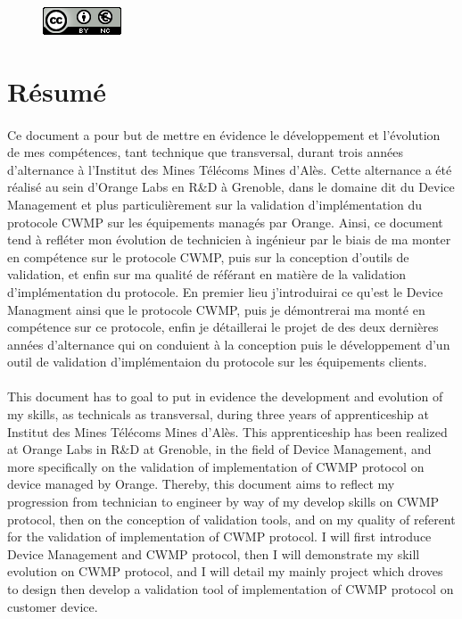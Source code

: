 \documentclass[12pt,a4paper]{report}
\begin{document}
\begin{figure}[!b]
	\center
    \includegraphics[scale=1]{./img/CC_BY-NC_2.png}
\end{figure}

\newpage
\section*{Résumé}
\paragraph*{}Ce document a pour but de mettre en évidence le développement et l'évolution de mes compétences, tant technique que transversal, durant trois années d'alternance à l'Institut des Mines Télécoms Mines d'Alès. Cette alternance a été réalisé au sein d'Orange Labs en R\&D à Grenoble, dans le domaine dit du Device Management et plus particulièrement sur la validation d'implémentation du protocole CWMP sur les équipements managés par Orange. Ainsi, ce document tend à refléter mon évolution de technicien à ingénieur par le biais de ma monter en compétence sur le protocole CWMP, puis sur la conception d'outils de validation, et enfin sur ma qualité de référant en matière de la validation d'implémentation du protocole. En premier lieu j'introduirai ce qu'est le Device Managment ainsi que le protocole CWMP, puis je démontrerai ma monté en compétence sur ce protocole, enfin je détaillerai le projet de des deux dernières années d'alternance qui on conduient à la conception puis le développement d'un outil de validation d'implémentaion du protocole sur les équipements clients.
\paragraph*{}This document has to goal to put in evidence the development and evolution of my skills, as technicals as transversal, during three years of apprenticeship at Institut des Mines Télécoms Mines d'Alès. This apprenticeship has been realized at Orange Labs in R\&D at Grenoble, in the field of Device Management, and more specifically on the validation of implementation of CWMP protocol on device managed by Orange. Thereby, this document aims to reflect my progression from technician to engineer by way of my develop skills on CWMP protocol, then on the conception of validation tools, and on my quality of referent for the validation of implementation of CWMP protocol. I will first introduce Device Management and CWMP protocol, then I will demonstrate my skill evolution on CWMP protocol, and I will detail my mainly project which droves to design then develop a validation tool of implementation of CWMP protocol on customer device.
\end{document}
